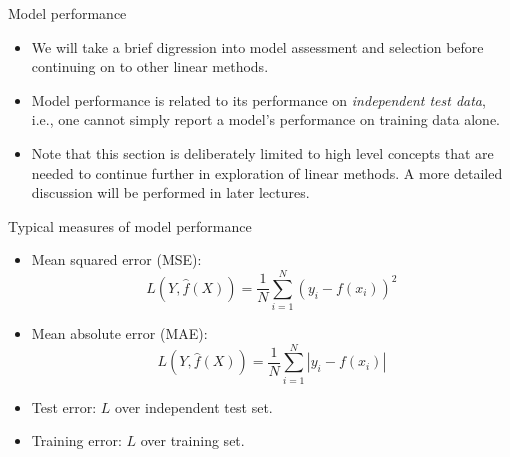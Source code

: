 \documentclass[aspectratio=169]{beamer}
\begin{document}
\begin{frame}{Model performance}
    \begin{itemize}
        \item We will take a brief digression into model assessment and selection before continuing on to other linear methods.
        \item Model performance is related to its performance on \textit{independent test data}, i.e., one cannot simply report a model's performance on training data alone.
        \item Note that this section is deliberately limited to high level concepts that are needed to continue further in exploration of linear methods. A more detailed discussion will be performed in later lectures.
    \end{itemize}
\end{frame} 


\begin{frame}{Typical measures of model performance}
    \begin{itemize}
        \item Mean squared error (MSE):
            \begin{equation*}
                L(Y, \hat{f}(X)) = \frac{1}{N}\sum_{i=1}^N (y_i - f(x_i))^2
            \end{equation*}
        \item Mean absolute error (MAE):
            \begin{equation*}
                L(Y, \hat{f}(X)) = \frac{1}{N}\sum_{i=1}^N \left| y_i - f(x_i) \right|
            \end{equation*}
        \item Test error: $L$ over independent test set.
        \item Training error: $L$ over training set.
    \end{itemize}
\end{frame}
\end{document}
